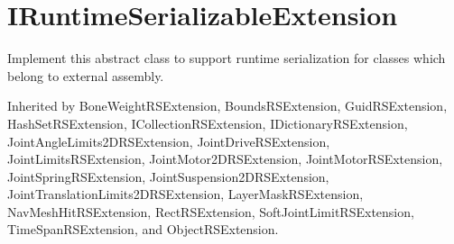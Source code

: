 \hypertarget{class_voxel_busters_1_1_runtime_serialization_1_1_i_runtime_serializable_extension}{}\section{I\+Runtime\+Serializable\+Extension}
\label{class_voxel_busters_1_1_runtime_serialization_1_1_i_runtime_serializable_extension}


Implement this abstract class to support runtime serialization for classes which belong to external assembly.  




Inherited by Bone\+Weight\+R\+S\+Extension, Bounds\+R\+S\+Extension, Guid\+R\+S\+Extension, Hash\+Set\+R\+S\+Extension, I\+Collection\+R\+S\+Extension, I\+Dictionary\+R\+S\+Extension, Joint\+Angle\+Limits2\+D\+R\+S\+Extension, Joint\+Drive\+R\+S\+Extension, Joint\+Limits\+R\+S\+Extension, Joint\+Motor2\+D\+R\+S\+Extension, Joint\+Motor\+R\+S\+Extension, Joint\+Spring\+R\+S\+Extension, Joint\+Suspension2\+D\+R\+S\+Extension, Joint\+Translation\+Limits2\+D\+R\+S\+Extension, Layer\+Mask\+R\+S\+Extension, Nav\+Mesh\+Hit\+R\+S\+Extension, Rect\+R\+S\+Extension, Soft\+Joint\+Limit\+R\+S\+Extension, Time\+Span\+R\+S\+Extension, and Object\+R\+S\+Extension.

